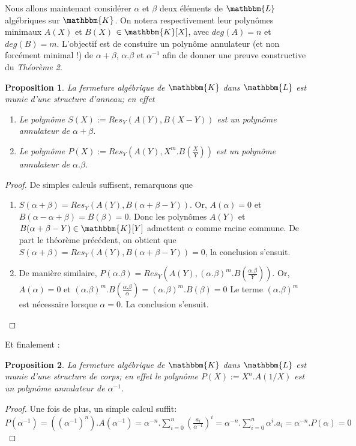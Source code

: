 \documentclass[12pt]{article}
\newcommand{\jL}{\mathbbm{L}}
\newcommand{\K}{\mathbbm{K}}
\newtheorem{prop}{Proposition}
\theoremstyle{definition}\newtheorem{defn}{Définition}
\theoremstyle{definition}\newtheorem{exm}{Exemple}
\theoremstyle{definition}\newtheorem{rem}{Remarque}
\theoremstyle{definition}\newtheorem{algo}{Algorithme}
\theoremstyle{remark}\newtheorem{exo}{Exercice}
\theoremstyle{remark}\newtheorem{nota}{Notation}
\begin{document}
Nous allons maintenant considérer $\alpha$ et $\beta$ deux éléments de $\jL$ algébriques sur $\K$. On notera respectivement leur polynômes minimaux $A(X)$ et $B(X)$ $\in \K[X]$, avec $deg(A) = n$ et $deg(B) = m$. L'objectif est de constuire un polynôme annulateur (et non forcément minimal !) de $\alpha + \beta$, $\alpha.\beta$ et $\alpha^{-1}$ afin de donner une preuve constructive du \textit{Théorème 2}.

\begin{prop}
La fermeture algébrique de $\K$ dans $\jL$ est munie d'une structure d'anneau; en effet
	\begin{enumerate}[label=\roman*)]
		\item Le polynôme $S(X) := Res_Y(A(Y),B(X-Y))$ est \textit{un} polynôme annulateur de $\alpha + \beta$.
		\item Le polynôme $P(X) := Res_Y(A(Y), X^m.B(\frac{X}{Y}))$ est \textit{un} polynôme annulateur de $\alpha.\beta$.
	\end{enumerate}
\end{prop}

\begin{proof} De simples calculs suffisent, remarquons que
	\begin{enumerate}[label=\roman*)]
		\item $S(\alpha + \beta) = Res_Y(A(Y),B(\alpha + \beta - Y))$. Or, $A(\alpha) = 0$ et $B (\alpha-\alpha + \beta) = B(\beta) = 0$. Donc les polynômes $A(Y)$ et $B (\alpha + \beta - Y) \in \K[Y]$ admettent $\alpha$ comme racine commune. De part le théorème précédent, on obtient que $S(\alpha + \beta) = Res_Y(A(Y),B(\alpha + \beta-Y)) = 0$, la conclusion s'ensuit. 
		\item De manière similaire, $P(\alpha.\beta) = Res_Y(A(Y), (\alpha.\beta)^m.B(\frac{\alpha.\beta}{Y}))$. Or, $A(\alpha) = 0$ et $(\alpha.\beta)^m.B(\frac{\alpha.\beta}{\alpha}) = (\alpha.\beta)^m.B(\beta) = 0$ Le terme $(\alpha.\beta)^m$ est nécessaire lorsque $\alpha = 0$. La conclusion s'ensuit.
	\end{enumerate}
\end{proof}
Et finalement :
\begin{prop}
La fermeture algébrique de $\K$ dans $\jL$ est munie d'une structure de corps; en effet le polynôme $P(X) := X^n.A(1/X)$ est un polynôme annulateur de $\alpha^{-1}$.
\end{prop}

\begin{proof}
Une fois de plus, un simple calcul suffit: \newline
$P(\alpha^{-1}) = ((\alpha^{-1})^n).A(\alpha^{-1}) = \alpha^{-n}.\displaystyle\sum_{i=0}^n (\frac{a_i}{\alpha^{-1}})^i = \alpha^{-n}.\sum_{i=0}^n \alpha^i.a_i = \alpha^{-n}.P(\alpha) = 0$
\end{proof}
\end{document}
